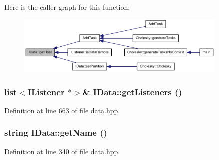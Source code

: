 Here is the caller graph for this function:\nopagebreak
\begin{figure}[H]
\begin{center}
\leavevmode
\includegraphics[width=286pt]{class_i_data_ae7dd611bb647deae870c56208e58db08_icgraph}
\end{center}
\end{figure}
\hypertarget{class_i_data_add4d3e831a14c7676edebe3b4579f3a6}{
\subsubsection[{getListeners}]{\setlength{\rightskip}{0pt plus 5cm}list$<${\bf IListener} $\ast$$>$\& IData::getListeners ()}}
\label{class_i_data_add4d3e831a14c7676edebe3b4579f3a6}


Definition at line 663 of file data.hpp.\hypertarget{class_i_data_a87b7baa5c42fd4c2b36875141030880d}{
\subsubsection[{getName}]{\setlength{\rightskip}{0pt plus 5cm}string IData::getName ()}}
\label{class_i_data_a87b7baa5c42fd4c2b36875141030880d}


Definition at line 340 of file data.hpp.

